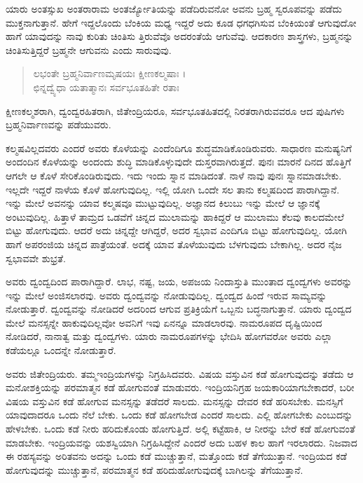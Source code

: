 ಯಾರು ಅಂತಸ್ಸುಖ ಅಂತರಾರಾಮ ಅಂತರ್ಜ್ಯೋತಿಯನ್ನು ಪಡೆದಿರುವನೋ ಅವನು ಬ್ರಹ್ಮ ಸ್ವರೂಪವನ್ನು ಪಡೆದು ಮುಕ್ತನಾಗುತ್ತಾನೆ. ಹೇಗೆ ಇದ್ದಲೊಂದು ಬೆಂಕಿಯ ಮಧ್ಯ ಇದ್ದರೆ ಅದು ಕೂಡ ಧಗಧಗಿಸುವ ಬೆಂಕಿಯಂತೆ ಆಗುವುದೋ ಹಾಗೆ ಯಾವುದನ್ನು ನಾವು ಕುರಿತು ಚಿಂತಿಸು ತ್ತಿರುವೆವೊ ಅದರಂತೆಯೆ ಆಗುವೆವು. ಆದಕಾರಣ ಶಾಸ್ತ್ರಗಳು, ಬ್ರಹ್ಮನನ್ನು ಚಿಂತಿಸುತ್ತಿದ್ದರೆ ಬ್ರಹ್ಮನೇ ಆಗುವನು ಎಂದು ಸಾರುವುವು.

\begin{verse}
ಲಭಂತೇ ಬ್ರಹ್ಮನಿರ್ವಾಣಮೃಷಯಃ ಕ್ಷೀಣಕಲ್ಮಷಾಃ ।\\ಛಿನ್ನದ್ವ್ಯೆಧಾ ಯತಾತ್ಮಾನಃ ಸರ್ವಭೂತಹಿತೇ ರತಾಃ 
\end{verse}

{\small ಕ್ಷೀಣಕಲ್ಮಶರಾಗಿ, ದ್ವಂದ್ವರಹಿತರಾಗಿ, ಜಿತೇಂದ್ರಿಯರೂ, ಸರ್ವಭೂತಹಿತದಲ್ಲಿ ನಿರತರಾಗಿರುವವರೂ ಆದ ಪುಷಿಗಳು ಬ್ರಹ್ಮನಿರ್ವಾಣವನ್ನು ಪಡೆಯುವರು.}

ಕಲ್ಮಷವಿಲ್ಲದವರು ಎಂದರೆ ಅವರು ಕೊಳೆಯನ್ನು ಎಂದೆಂದಿಗೂ ಶುದ್ಧಮಾಡಿಕೊಂಡಿರುವರು. ಸಾಧಾರಣ ಮನುಷ್ಯನಿಗೆ ಅಂದಂದಿನ ಕೊಳೆಯನ್ನು ಅಂದಂದು ಶುದ್ಧಿ ಮಾಡಿಕೊಳ್ಳುವುದೇ ದುಸ್ತರವಾಗಿರುತ್ತದೆ. ಪುನಃ ಮಾರನೆ ದಿನದ ಹೊತ್ತಿಗೆ ಆಗಲೇ ಆ ಕೊಳೆ ಸೇರಿಕೊಂಡಿರುವುದು. ಇದು ಇಂದು ಸ್ನಾನ ಮಾಡಿದಂತೆ. ನಾಳೆ ನಾವು ಪುನಃ ಸ್ನಾನಮಾಡಬೇಕು. ಇಲ್ಲದೇ ಇದ್ದರೆ ನಾಳೆಯ ಕೊಳೆ ಹೋಗುವುದಿಲ್ಲ. ಇಲ್ಲಿ ಯೋಗಿ ಒಂದೇ ಸಲ ತಾನು ಕಲ್ಮಷದಿಂದ ಪಾರಾಗಿದ್ದಾನೆ. ಇನ್ನು ಮೇಲೆ ಅವನನ್ನು ಯಾವ ಕಲ್ಮಷವೂ ಮುಟ್ಟುವುದಿಲ್ಲ. ಅಜ್ಞಾನದ ಕಿಲುಬು ಇನ್ನು ಮೇಲೆ ಆ ಜ್ಞಾನಕ್ಕೆ ಅಂಟುವುದಿಲ್ಲ. ಹಿತ್ತಾಳೆ ತಾಮ್ರದ ಒಡವೆಗೆ ಚಿನ್ನದ ಮುಲಾಮನ್ನು ಹಾಕಿದ್ದರೆ ಆ ಮುಲಾಮು ಕೆಲವು ಕಾಲದಮೇಲೆ ಬಿಟ್ಟು ಹೋಗುವುದು. ಆದರೆ ಅದು ಚಿನ್ನದ್ದೇ ಆಗಿದ್ದರೆ, ಅದರ ಸ್ವಭಾವ ಎಂದಿಗೂ ಬಿಟ್ಟು ಹೋಗುವುದಿಲ್ಲ. ಯೋಗಿ ಹಾಗೆ ಅಪರಂಜಿಯ ಚಿನ್ನದ ಪಾತ್ರೆಯಂತೆ. ಅದಕ್ಕೆ ಯಾವ ತೊಳೆಯುವುದು ಬೆಳಗುವುದು ಬೇಕಾಗಿಲ್ಲ. ಅದರ ನೈಜ ಸ್ವಭಾವವೇ ಶುಭ್ರತೆ.

ಅವರು ದ್ವಂದ್ವದಿಂದ ಪಾರಾಗಿದ್ದಾರೆ. ಲಾಭ, ನಷ್ಟ, ಜಯ, ಅಪಜಯ ನಿಂದಾಸ್ತುತಿ ಮುಂತಾದ ದ್ವಂದ್ವಗಳು ಅವರನ್ನು ಇನ್ನು ಮೇಲೆ ಅಂಜಿಸಲಾರವು. ಅವರು ದ್ವಂದ್ವವನ್ನು ನೋಡುವುದಿಲ್ಲ. ದ್ವಂದ್ವದ ಹಿಂದೆ ಇರುವ ಸಾಮ್ಯವನ್ನು ನೋಡುತ್ತಾರೆ. ದ್ವಂದ್ವವನ್ನು ನೋಡಿದರೆ ಅದರಿಂದ ಆಗುವ ಪ್ರತಿಕ್ರಿಯೆಗೆ ಒಬ್ಬನು ಬದ್ಧನಾಗುತ್ತಾನೆ. ಯಾರು ದ್ವಂದ್ವದ ಮೇಲೆ ಮನಸ್ಸನ್ನೇ ಹಾಕುವುದಿಲ್ಲವೋ ಅವನಿಗೆ ಇವು ಏನನ್ನೂ ಮಾಡಲಾರವು. ನಾಮರೂಪದ ದೃಷ್ಟಿಯಿಂದ ನೋಡಿದರೆ, ನಾನಾತ್ವ ಮತ್ತು ದ್ವಂದ್ವಗಳು. ಯಾರು ನಾಮರೂಪಗಳನ್ನು ಭೇದಿಸಿ ಹೋಗವರೋ ಅವರು ಎಲ್ಲಾ ಕಡೆಯಲ್ಲೂ ಒಂದನ್ನೇ ನೋಡುತ್ತಾರೆ.

ಅವರು ಜಿತೇಂದ್ರಿಯರು. ತಮ್ಮಇಂದ್ರಿಯಗಳನ್ನು ನಿಗ್ರಹಿಸಿದವರು. ವಿಷಯ ವಸ್ತುವಿನ ಕಡೆ ಹೋಗುವುದನ್ನು ತಡೆದು ಆ ಮನೋಶಕ್ತಿಯನ್ನು ಪರಮಾತ್ಮನ ಕಡೆ ಹೋಗುವಂತೆ ಮಾಡುವರು. ಇಂದ್ರಿಯನಿಗ್ರಹ ಜಯಕಾರಿಯಾಗಬೇಕಾದರೆ, ಬರೀ ವಿಷಯ ವಸ್ತುವಿನ ಕಡೆ ಹೋಗುವ ಮನಸ್ಸನ್ನು ತಡೆದರೆ ಸಾಲದು. ಮನಸ್ಸನ್ನು ದೇವರ ಕಡೆ ಹರಿಸಬೇಕು. ಮನಸ್ಸಿಗೆ ಯಾವುದಾದರೂ ಒಂದು ನೆಲೆ ಬೇಕು. ಒಂದು ಕಡೆ ಹೋಗಬೇಡ ಎಂದರೆ ಸಾಲದು. ಎಲ್ಲಿ ಹೋಗಬೇಕು ಎಂಬುದನ್ನು ಹೇಳಬೇಕು. ಒಂದು ಕಡೆ ನೀರು ಹರಿದುಕೊಂಡು ಹೋಗುತ್ತಿದೆ. ಅಲ್ಲಿ ಕಟ್ಟೆಹಾಕಿ, ಆ ನೀರನ್ನು ಬೇರೆ ಕಡೆ ಹೋಗುವಂತೆ ಮಾಡಬೇಕು. ಇಂದ್ರಿಯವನ್ನು ಯಶಸ್ವಿಯಾಗಿ ನಿಗ್ರಹಿಸಿದ್ದೇನೆ ಎಂದರೆ ಅದು ಬಹಳ ಕಾಲ ಹಾಗೆ ಇರಲಾರದು. ನಿಜವಾದ ಈ ರಹಸ್ಯವನ್ನು ಅರಿತವನು ಅದನ್ನು ಒಂದು ಕಡೆ ಮುಚ್ಚುತ್ತಾನೆ, ಮತ್ತೊಂದು ಕಡೆ ತೆಗೆಯುತ್ತಾನೆ. ಇಂದ್ರಿಯದ ಕಡೆ ಹೋಗುವುದನ್ನು ಮುಚ್ಚುತ್ತಾನೆ, ಪರಮಾತ್ಮನ ಕಡೆ ಹರಿದುಹೋಗುವುದಕ್ಕೆ ಬಾಗಿಲನ್ನು ತೆಗೆಯುತ್ತಾನೆ.

